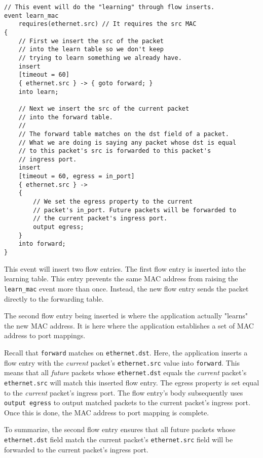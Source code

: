 \begin{codepage}
\begin{lstlisting}
// This event will do the "learning" through flow inserts.
event learn_mac
	requires(ethernet.src) // It requires the src MAC
{
	// First we insert the src of the packet
	// into the learn table so we don't keep
	// trying to learn something we already have.
	insert
	[timeout = 60]
	{ ethernet.src } -> { goto forward; }
	into learn;

	// Next we insert the src of the current packet
	// into the forward table.
	//
	// The forward table matches on the dst field of a packet.
	// What we are doing is saying any packet whose dst is equal
	// to this packet's src is forwarded to this packet's
	// ingress port.
	insert
	[timeout = 60, egress = in_port]
	{ ethernet.src } ->
	{
		// We set the egress property to the current
		// packet's in_port. Future packets will be forwarded to
		// the current packet's ingress port.
		output egress;
	}
	into forward;
}
\end{lstlisting}
\end{codepage}

This event will insert two flow entries. The first flow entry is inserted into
the learning table. This entry prevents the same MAC address from raising the
\texttt{learn\_mac} event more than once. Instead, the new flow entry sends the
packet directly to the forwarding table.

The second flow entry being inserted is where the application actually "learns" the new MAC
address. It is here where the application establishes a set of MAC address to port mappings.

Recall that \texttt{forward} matches on \texttt{ethernet.dst}. Here, the application inserts a
flow entry with the \textit{current} packet's \texttt{ethernet.src} value into
\texttt{forward}. This means that all \textit{future} packets whose
\texttt{ethernet.dst} equals the \textit{current} packet's \texttt{ethernet.src}
will match this inserted flow entry. The egress property is set equal to the
\textit{current} packet's ingress port. The flow entry's body subsequently uses
\texttt{output egress} to output matched packets to the current packet's ingress port. Once this is done, the MAC address to port mapping is complete.

To summarize, the second flow entry ensures that all future packets whose
\texttt{ethernet.dst} field match the current packet's \texttt{ethernet.src}
field will be forwarded to the current packet's ingress port.

